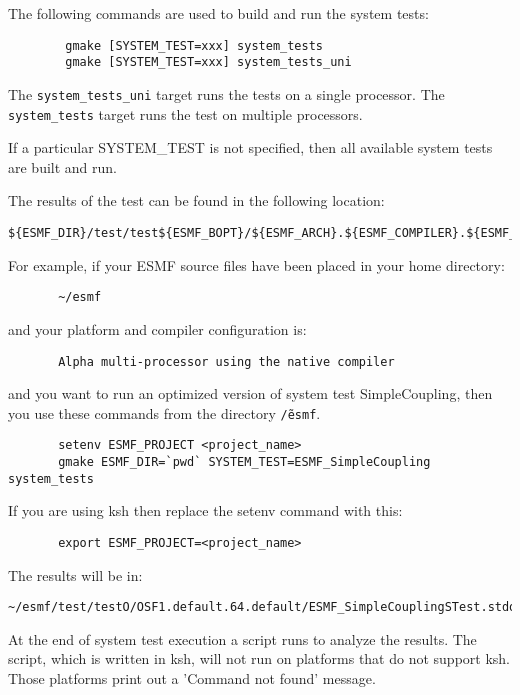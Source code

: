 The following commands are used to build and run the system tests:

\begin{verbatim}
        gmake [SYSTEM_TEST=xxx] system_tests
        gmake [SYSTEM_TEST=xxx] system_tests_uni
\end{verbatim}

The {\tt system\_tests\_uni} target runs the tests on a single processor. 
The {\tt system\_tests} target runs the test on multiple processors.

If a particular SYSTEM\_TEST is not specified, then all available system tests 
are built and run.

The results of the test can be found in the following location:
\begin{verbatim}
${ESMF_DIR}/test/test${ESMF_BOPT}/${ESMF_ARCH}.${ESMF_COMPILER}.${ESMF_PREC}.${ESMF_SITE}
\end{verbatim}

For example, if your ESMF source files have been placed in your home directory:
\begin{verbatim}
       ~/esmf
\end{verbatim}

and your platform and compiler configuration is:
\begin{verbatim}
       Alpha multi-processor using the native compiler
\end{verbatim}

and you want to run an optimized version of system test SimpleCoupling,
then you use these commands from the directory {\tt \~/esmf}. 
\begin{verbatim}
       setenv ESMF_PROJECT <project_name>
       gmake ESMF_DIR=`pwd` SYSTEM_TEST=ESMF_SimpleCoupling system_tests
\end{verbatim}

If you are using ksh then replace the setenv command with
this:

\begin{verbatim}
       export ESMF_PROJECT=<project_name>
\end{verbatim}

The results will be in:
\begin{verbatim}
~/esmf/test/testO/OSF1.default.64.default/ESMF_SimpleCouplingSTest.stdout
\end{verbatim}

At the end of system test execution a script runs to analyze the results.
The script, which is written in ksh, will not run on platforms that do not support
ksh. Those platforms print out a 'Command not found' message.

